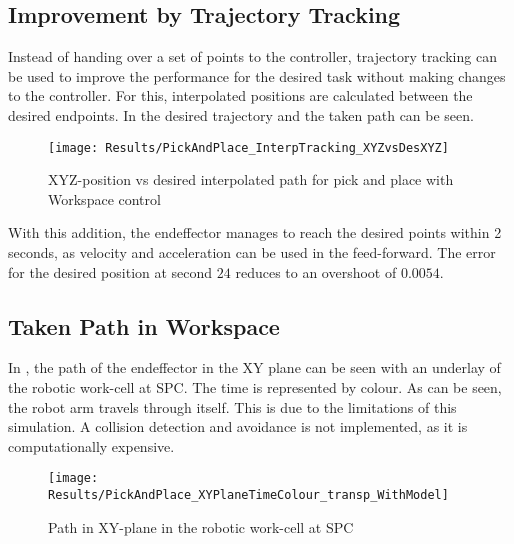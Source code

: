 \subsection{Improvement by Trajectory Tracking}
Instead of handing over a set of points to the controller, trajectory tracking can be used to improve the performance for the desired task without making changes to the controller.
For this, interpolated positions are calculated between the desired endpoints.
In  the desired trajectory and the taken path can be seen.
\begin{figure}[H]
	\texttt{[image: Results/PickAndPlace\_InterpTracking\_XYZvsDesXYZ]}
	\caption{XYZ-position vs desired interpolated path for pick and place with Workspace control}
	\label{fig:PickAndPlace_InterpTracking_XYZvsDesXYZ}
\end{figure}
With this addition, the endeffector manages to reach the desired points within 2 seconds, as velocity and acceleration can be used in the feed-forward. The error for the desired position at second $24$ reduces to an overshoot of $0.0054$.

\subsection{Taken Path in Workspace}
In , the path of the endeffector in the XY plane can be seen with an underlay of the robotic work-cell at SPC. The time is represented by colour.
As can be seen, the robot arm travels through itself. This is due to the limitations of this simulation. A collision detection and avoidance is not implemented, as it is computationally expensive. 

\begin{figure}[H]
	\texttt{[image: Results/PickAndPlace\_XYPlaneTimeColour\_transp\_WithModel]}
	\caption{Path in XY-plane in the robotic work-cell at SPC}
	\label{fig:PickAndPlace_XYPlane_WithModel}
\end{figure}